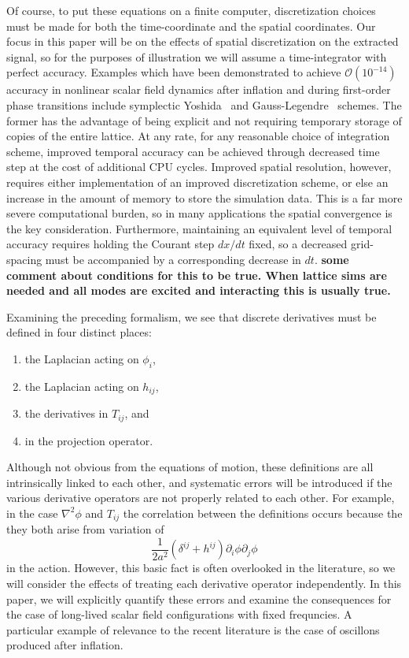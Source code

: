 \documentclass{revtex4}
\begin{document}
Of course, to put these equations on a finite computer, discretization choices must be made for both the time-coordinate and the spatial coordinates.
Our focus in this paper will be on the effects of spatial discretization on the extracted signal, so for the purposes of illustration we will assume a time-integrator with perfect accuracy.
Examples which have been demonstrated to achieve $\mathcal{O}(10^{-14})$ accuracy in nonlinear scalar field dynamics after inflation and during first-order phase transitions include symplectic Yoshida~\cite{} and Gauss-Legendre~\cite{} schemes.
The former has the advantage of being explicit and not requiring temporary storage of copies of the entire lattice.
At any rate, for any reasonable choice of integration scheme, improved temporal accuracy can be achieved through decreased time step at the cost of additional CPU cycles.
Improved spatial resolution, however, requires either implementation of an improved discretization scheme, or else an increase in the amount of memory to store the simulation data.
This is a far more severe computational burden, so in many applications the spatial convergence is the key consideration.
Furthermore, maintaining an equivalent level of temporal accuracy requires holding the Courant step $dx/dt$ fixed, so a decreased grid-spacing must be accompanied by a corresponding decrease in $dt$. {\bf some comment about conditions for this to be true.  When lattice sims are needed and all modes are excited and interacting this is usually true.}

Examining the preceding formalism, we see that discrete derivatives must be defined in four distinct places:
\begin{enumerate}
\item the Laplacian acting on $\phi_i$,
\item the Laplacian acting on $h_{ij}$,
\item the derivatives in $T_{ij}$, and
\item in the projection operator.
\end{enumerate}
Although not obvious from the equations of motion, these definitions are all intrinsically linked to each other, and systematic errors will be introduced if the various derivative operators are not properly related to each other.
For example, in the case $\nabla^2\phi$ and $T_{ij}$ the correlation between the definitions occurs because the they both arise from variation of
\begin{equation}
  \frac{1}{2a^2}\left(\delta^{ij}+h^{ij}\right)\partial_i\phi\partial_j\phi
\end{equation}
in the action.
However, this basic fact is often overlooked in the literature, so we will consider the effects of treating each derivative operator independently.
In this paper, we will explicitly quantify these errors and examine the consequences for the case of long-lived scalar field configurations with fixed frequncies.
A particular example of relevance to the recent literature is the case of oscillons produced after inflation.
\end{document}
